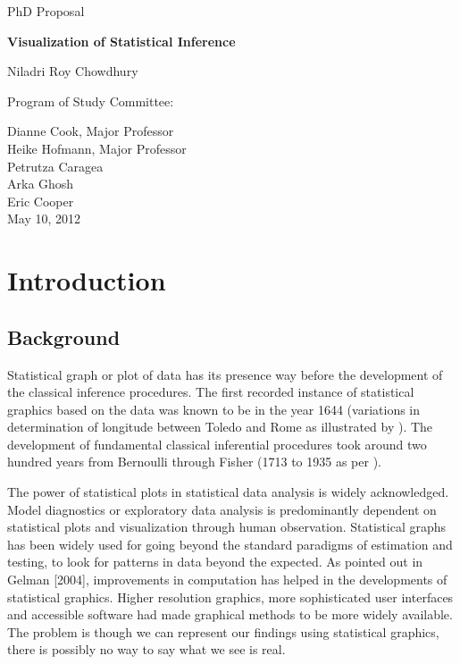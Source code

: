 \documentclass[12]{report}
\begin{document}
\thispagestyle{empty}

\begin{center}

\vspace{2in}

PhD Proposal \\ 

\vspace{.5in}

\Large{\bf Visualization of Statistical Inference}

\vspace{1in}

\large{Niladri Roy Chowdhury} 

\vspace{3in}
Program of Study Committee: 

\vspace{.5in}
Dianne Cook, Major Professor \\
Heike Hofmann, Major Professor \\
Petrutza Caragea \\
Arka Ghosh \\
Eric Cooper\\

\vspace{1.5in}
May 10, 2012 
\end{center}

\tableofcontents

\chapter{Introduction}\label{ch:introduction}


\section{Background}Statistical graph or plot of data has its presence way before the development of the classical inference procedures. The first recorded instance of statistical graphics based on the data was known to be in the year 1644 (variations in determination of longitude between Toledo and Rome as illustrated by \cite{friendly:2001}). The development of fundamental classical inferential procedures took around two hundred years from Bernoulli through Fisher (1713 to 1935 as per \cite{hald:2004}). 

The power of statistical plots in statistical data analysis is widely acknowledged. Model diagnostics or exploratory data analysis is predominantly dependent on statistical plots and visualization through human observation. Statistical graphs has been widely used for going beyond the standard paradigms of estimation and testing, to look for patterns in data beyond the expected. As pointed out in Gelman [2004], improvements in computation has helped in the developments of statistical graphics. Higher resolution graphics, more sophisticated user interfaces and accessible software had made graphical methods to be more widely available. The problem is though we can represent our findings using statistical graphics, there is possibly no way to say what we see is real. 
\end{document}
